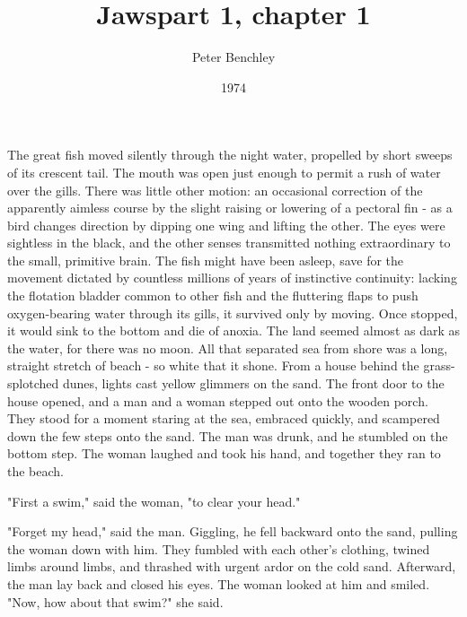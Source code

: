 \documentclass[10pt,a5paper,twoside]{book}
\newcommand{\subtitle}[1]{\vspace{10pt}\newline\normalsize\plantin #1}
\begin{document}
\title{Jaws\subtitle{part 1, chapter 1}}
\date{1974}
\author{Peter Benchley}


\maketitle


\chapter*{}    
\noindent\linenumbers The great fish moved silently through the night water, propelled by short sweeps of its crescent tail. The mouth was open just enough to permit a rush of water over the gills. There was little other motion: an occasional correction of the apparently aimless course by the slight raising or lowering of a pectoral fin - as a bird changes direction by dipping one wing and lifting the other. The eyes were sightless in the black, and the other senses transmitted nothing extraordinary to the small, primitive brain. The fish might have been asleep, save for the movement dictated by countless millions of years of instinctive continuity: lacking the flotation bladder common to other fish and the fluttering flaps to push oxygen-bearing water through its gills, it survived only by moving. Once stopped, it would sink to the bottom and die of anoxia. The land seemed almost as dark as the water, for there was no moon. All that separated sea from shore was a long, straight stretch of beach - so white that it shone. From a house behind the grass-splotched dunes, lights cast yellow glimmers on the sand. The front door to the house opened, and a man and a woman stepped out onto the wooden porch. They stood for a moment staring at the sea, embraced quickly, and scampered down the few steps onto the sand. The man was drunk, and he stumbled on the bottom step. The woman laughed and took his hand, and together they ran to the beach.

"First a swim," said the woman, "to clear your head."

"Forget my head," said the man. Giggling, he fell backward onto the sand, pulling the woman down with him. They fumbled with each other's clothing, twined limbs around limbs, and thrashed with urgent ardor on the cold sand. Afterward, the man lay back and closed his eyes. The woman looked at him and smiled. "Now, how about that swim?" she said.
\end{document}

